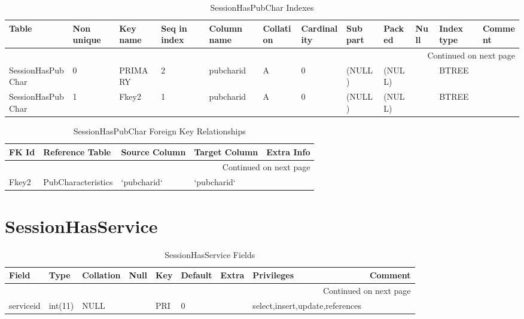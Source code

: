 \documentclass[tablesignature,landscape]{scrartcl}
\begin{document}
\begin{longtable}{|l|l|l|l|l|l|l|l|l|l|l|l|}
\caption{SessionHasPubChar Indexes} \label{tbl:sessionhaspubcharindexes}\\
\hline
 Table              &  Non unique  &  Key name  &  Seq in index  &  Column name  &  Collation  &  Cardinality  &  Sub part  &  Packed  &  Null  &  Index type  &  Comment \\
\hline
\endhead
\hline\multicolumn{12}{r}{Continued on next page}\
\endfoot
\endlastfoot
\hline
 SessionHasPubChar  &           0  &  PRIMARY   &             1  &  sessionid    &  A          &            0  &  (NULL)    &  (NULL)  &        &  BTREE       &           \\
 SessionHasPubChar  &           0  &  PRIMARY   &             2  &  pubcharid    &  A          &            0  &  (NULL)    &  (NULL)  &        &  BTREE       &           \\
 SessionHasPubChar  &           1  &  Fkey2     &             1  &  pubcharid    &  A          &            0  &  (NULL)    &  (NULL)  &        &  BTREE       &           \\
\hline
\end{longtable}


\begin{longtable}{|l|l|l|l|l|}
\caption{SessionHasPubChar Foreign Key Relationships} \label{tbl:sessionhaspubcharfkr}\\
\hline
 FK Id  &  Reference Table     &  Source Column  &  Target Column  &  Extra Info \\
\hline
\endhead
\hline\multicolumn{5}{r}{Continued on next page}\
\endfoot
\endlastfoot
\hline
 Fkey1  &  Sessions            &  `sessionid`    &  `sessionid`    &              \\
 Fkey2  &  PubCharacteristics  &  `pubcharid`    &  `pubcharid`    &              \\
\hline
\end{longtable}
\section{SessionHasService}
\label{sec-28}


\begin{longtable}{|l|l|l|l|l|l|l|l|l|}
\caption{SessionHasService Fields} \label{tbl:sessionhasservicefields}\\
\hline
 Field      &  Type     &  Collation  &  Null  &  Key  &  Default  &  Extra  &  Privileges                       &  Comment \\
\hline
\endhead
\hline\multicolumn{9}{r}{Continued on next page}\
\endfoot
\endlastfoot
\hline
 sessionid  &  int(11)  &  NULL       &        &  PRI  &        0  &         &  select,insert,update,references  &           \\
 serviceid  &  int(11)  &  NULL       &        &  PRI  &        0  &         &  select,insert,update,references  &           \\
\hline
\end{longtable}
\end{document}
